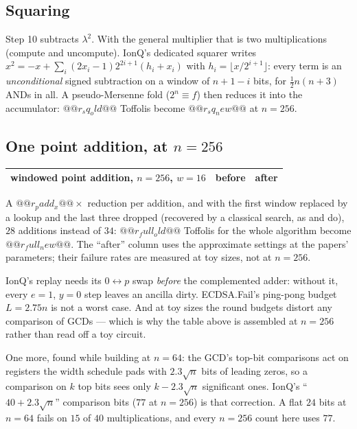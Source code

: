 \subsection{Squaring}

Step 10 subtracts $\lambda^2$. With the general multiplier that is two multiplications (compute and
uncompute). IonQ's dedicated squarer writes $x^2=-x+\sum_i(2x_i-1)2^{2i+1}(h_i+x_i)$ with
$h_i=\lfloor x/2^{i+1}\rfloor$: every term is an \emph{unconditional} signed subtraction on a window
of $n+1-i$ bits, for $\tfrac12n(n+3)$ ANDs in all. A pseudo-Mersenne fold ($2^n\equiv f$) then
reduces it into the accumulator: $@@r_sq_old@@$ Toffolis become $@@r_sq_new@@$ at $n=256$.

\subsection{One point addition, at $n=256$}

\begin{center}\small
\begin{tabular}{lrr}
\toprule
windowed point addition, $n=256$, $w=16$ & before & after\\
\midrule
\bottomrule
\end{tabular}
\end{center}

A $@@r_padd_x@@\times$ reduction per addition, and with the first window replaced by a lookup and
the last three dropped (recovered by a classical search, as \cite{ec:babbush26} and
\cite{ec:ionq26} do), $28$ additions instead of $34$: $@@r_full_old@@$ Toffolis for the whole
algorithm become $@@r_full_new@@$. The ``after'' column uses the approximate settings at the papers'
parameters; their failure rates are measured at toy sizes, not at $n=256$.

\begin{warnbox}[title={What reproducing the sources turned up}]
IonQ's replay needs its $0\leftrightarrow p$ swap \emph{before} the complemented adder: without it,
every $e=1$, $y=0$ step leaves an ancilla dirty. ECDSA.Fail's ping-pong budget $L=2.75n$ is not a
worst case. And at toy sizes the round budgets distort any comparison of GCDs --- which is why the
table above is assembled at $n=256$ rather than read off a toy circuit.

One more, found while building at $n=64$: the GCD's top-bit comparisons act on registers the width
schedule pads with $2.3\sqrt n$ bits of leading zeros, so a comparison on $k$ top bits sees only
$k-2.3\sqrt n$ significant ones. IonQ's ``$40+2.3\sqrt n$'' comparison bits ($77$ at $n=256$) is
that correction. A flat $24$ bits at $n=64$ fails on $15$ of $40$ multiplications, and every
$n=256$ count here uses $77$.
\end{warnbox}


